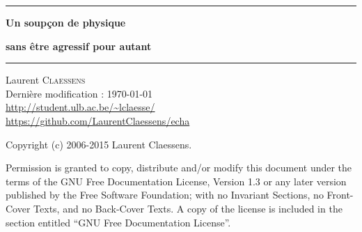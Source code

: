 
\thispagestyle{empty}
\begin{center}
  \begin{minipage}{15cm}
    \hrule\par
    \vspace{2mm}
    \begin{center}
    \Huge \bfseries Un soupçon de physique  \par
    \Huge \bfseries sans être agressif pour autant \par
    \end{center}
    \hrule\par
  \end{minipage}
\end{center}

\vfill\vfill
\null\hfill Laurent \textsc{Claessens}\\
\null\hfill Dernière modification : \today\\
\null\hfill \url{http://student.ulb.ac.be/~lclaesse/}\\
\null\hfill \url{https://github.com/LaurentClaessens/echa}

\newpage

Copyright (c) 2006-2015  Laurent Claessens.

Permission is granted to copy, distribute and/or modify this document under the terms of the GNU Free Documentation License, Version 1.3 or any later version published by the Free Software Foundation; with no Invariant Sections, no Front-Cover Texts, and no Back-Cover Texts. A copy of the license is included in the section entitled ``GNU Free Documentation License''.


